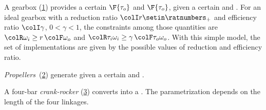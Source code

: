 
\begin{example}
    A gearbox (\cref{fig:gearbox}) provides a certain  $\F{\tau_o}$ and  $\F{\tau_o}$, given a certain  and .
    For an ideal gearbox with a reduction ratio ${\colI r} \setin \ratnumbers_+$ and efficiency ratio $\colI\gamma$, $0<\gamma<1$, the constraints among those quantities are ${\colR \omega_i}\geq r\,{\colF \omega_o}$ and ${\colR \tau_i\omega_i}\geq\gamma\,{\colF \tau_o\omega_o}$.
    With this simple model, the set of implementations are given by the possible values of reduction and efficiency ratio.
\end{example}

\begin{figure}[h]
    \centering
    \caption{}
    \label{fig:gearbox}
\end{figure}

\begin{example}
    \emph{Propellers}~(\cref{fig:propeller}) generate  given a certain  and .
\end{example}
\begin{figure}[h]
    \centering
    \caption{}
    \label{fig:propeller}
\end{figure}

\begin{example}
    A four-bar \emph{crank-rocker} (\cref{fig:crack}) converts  into a .
    The parametrization depends on the length of the four linkages.
\end{example}

\begin{figure}[h]
    \centering
    \caption{}
    \label{fig:crack}
\end{figure}

